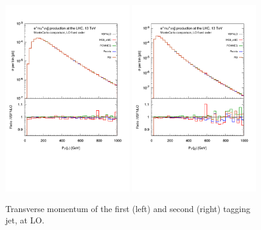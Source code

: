 \documentclass[a4paper,10pt]{report}
\begin{document}
\begin{figure}[h!]
   \centering
   \includegraphics[width=0.49\textwidth,angle=0,clip=true,trim={0.4cm 4.cm 0.6cm 1.5cm}]{figures/ptj1_LO.pdf}
   \includegraphics[width=0.49\textwidth,angle=0,clip=true,trim={0.4cm 4.cm 0.6cm 1.5cm}]{figures/ptj2_LO.pdf}
\caption{\label{fig:ptj1-2LO}Transverse momentum of the first (left) and second (right) tagging jet, at LO.
}
\end{figure}
%
\end{document}
